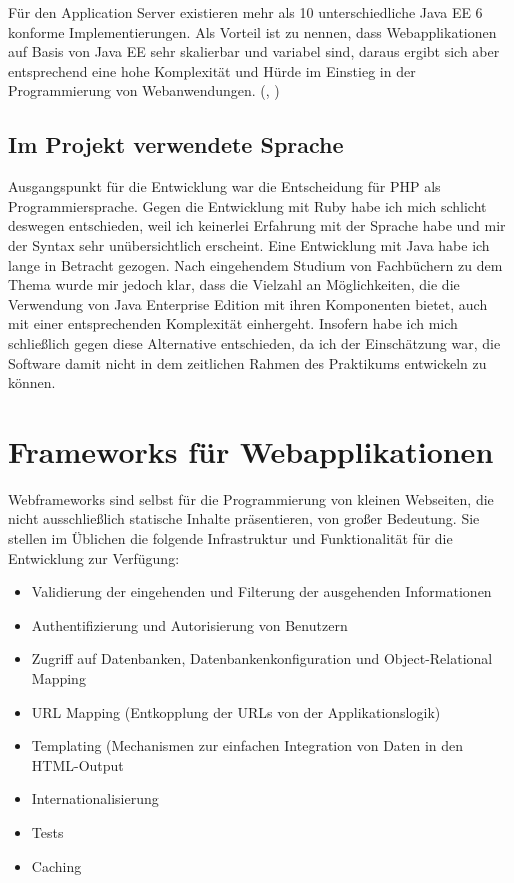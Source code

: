 \documentclass[12pt]{report}
\begin{document}
Für den Application Server existieren mehr als 10 unterschiedliche Java EE 6 konforme Implementierungen. Als Vorteil ist zu nennen, dass Webapplikationen auf Basis von Java EE sehr skalierbar und variabel sind, daraus ergibt sich aber entsprechend eine hohe Komplexität und Hürde im Einstieg in der Programmierung von Webanwendungen. (\cite{eberling2007enterprise}, \cite{mueller2010javaserver})

\subsection{Im Projekt verwendete Sprache}

Ausgangspunkt für die Entwicklung war die Entscheidung für PHP als Programmiersprache. Gegen die Entwicklung mit Ruby habe ich mich schlicht deswegen entschieden, weil ich keinerlei Erfahrung mit der Sprache habe und mir der Syntax sehr unübersichtlich erscheint. Eine Entwicklung mit Java habe ich lange in Betracht gezogen. Nach eingehendem Studium von Fachbüchern zu dem Thema wurde mir jedoch klar, dass die Vielzahl an Möglichkeiten, die die Verwendung von Java Enterprise Edition mit ihren Komponenten bietet, auch mit einer entsprechenden Komplexität einhergeht. Insofern habe ich mich schließlich gegen diese Alternative entschieden, da ich der Einschätzung war, die Software damit nicht in dem zeitlichen Rahmen des Praktikums entwickeln zu können.

\section{Frameworks für Webapplikationen}
\label{sec:Frameworks}
Webframeworks sind selbst für die Programmierung von kleinen Webseiten, die nicht ausschließlich statische Inhalte präsentieren, von großer Bedeutung. Sie stellen im Üblichen die folgende Infrastruktur und Funktionalität für die Entwicklung zur Verfügung:

\begin{itemize} 
\item Validierung der eingehenden und Filterung der ausgehenden Informationen 
\item Authentifizierung und Autorisierung von Benutzern
\item Zugriff auf Datenbanken, Datenbankenkonfiguration und Object-Relational Mapping
\item URL Mapping (Entkopplung der URLs von der Applikationslogik)
\item Templating (Mechanismen zur einfachen Integration von Daten in den HTML-Output
\item Internationalisierung
\item Tests
\item Caching
\end{itemize}
\end{document}
